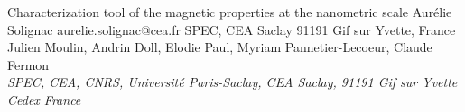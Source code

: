 \begin{conf-abstract}[]
{Characterization tool of the magnetic properties at the nanometric scale}
{\color{blue} Aurélie Solignac}
{aurelie.solignac@cea.fr}
{SPEC, CEA Saclay 91191 Gif sur Yvette, France}
{{\color{blue}Julien Moulin, Andrin Doll, Elodie Paul, Myriam Pannetier-Lecoeur, Claude Fermon}\\ \textit{SPEC, CEA, CNRS, Université Paris-Saclay, CEA Saclay, 91191 Gif sur Yvette  Cedex France}\\ 
\decofourleft \decofourright}





\printbibliography[heading=none]

\end{conf-abstract}
